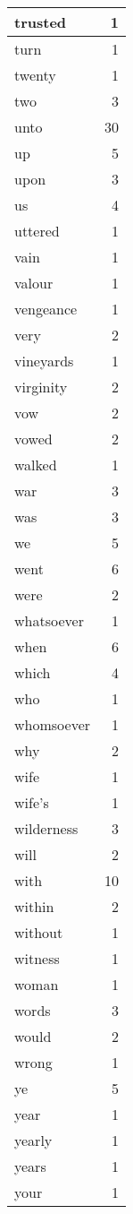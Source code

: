 \begin{center}
\begin{longtable}{l|r}
trusted & 1\\ \hline 
turn & 1\\ \hline 
twenty & 1\\ \hline 
two & 3\\ \hline 
unto & 30\\ \hline 
up & 5\\ \hline 
upon & 3\\ \hline 
us & 4\\ \hline 
uttered & 1\\ \hline 
vain & 1\\ \hline 
valour & 1\\ \hline 
vengeance & 1\\ \hline 
very & 2\\ \hline 
vineyards & 1\\ \hline 
virginity & 2\\ \hline 
vow & 2\\ \hline 
vowed & 2\\ \hline 
walked & 1\\ \hline 
war & 3\\ \hline 
was & 3\\ \hline 
we & 5\\ \hline 
went & 6\\ \hline 
were & 2\\ \hline 
whatsoever & 1\\ \hline 
when & 6\\ \hline 
which & 4\\ \hline 
who & 1\\ \hline 
whomsoever & 1\\ \hline 
why & 2\\ \hline 
wife & 1\\ \hline 
wife's & 1\\ \hline 
wilderness & 3\\ \hline 
will & 2\\ \hline 
with & 10\\ \hline 
within & 2\\ \hline 
without & 1\\ \hline 
witness & 1\\ \hline 
woman & 1\\ \hline 
words & 3\\ \hline 
would & 2\\ \hline 
wrong & 1\\ \hline 
ye & 5\\ \hline 
year & 1\\ \hline 
yearly & 1\\ \hline 
years & 1\\ \hline 
your & 1\\ \hline 
\end{longtable}
\end{center}



